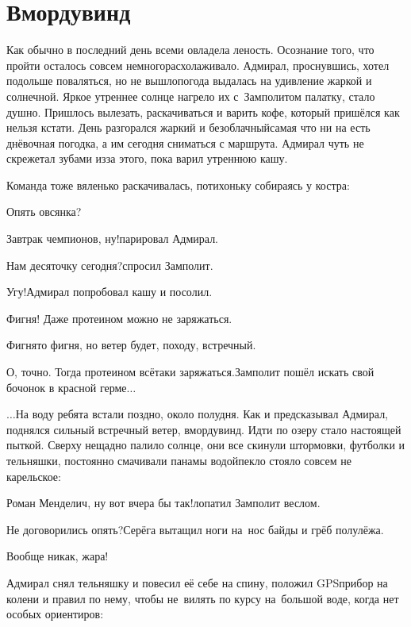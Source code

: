 \chapter{Вмордувинд}
\vepsianrose

Как обычно в последний день всеми овладела леность. Осознание того, что пройти осталось совсем немного\mdash расхолаживало. Адмирал, проснувшись, хотел подольше поваляться, но не вышло\mdash погода выдалась на удивление жаркой и солнечной. Яркое утреннее солнце нагрело их с~Замполитом палатку, стало душно. Пришлось вылезать, раскачиваться и варить кофе, который пришёлся как нельзя кстати. День разгорался жаркий и безоблачный\mdash самая что ни на есть днёвочная погодка, а им сегодня сниматься с маршрута. Адмирал чуть не скрежетал зубами из\sdash за этого, пока варил утреннюю кашу. 

Команда тоже вяленько раскачивалась, потихоньку собираясь у костра:

\diagdash Опять овсянка?

\diagdash Завтрак чемпионов, ну!\mdash парировал Адмирал.

\diagdash Нам десяточку сегодня?\mdash спросил Замполит.

\diagdash Угу!\mdash Адмирал попробовал кашу и посолил.

\diagdash Фигня! Даже протеином можно не заряжаться.

\diagdash Фигня\sdash то фигня, но ветер будет, походу, встречный. 

\diagdash О, точно. Тогда протеином всё\sdash таки заряжаться.\mdash Замполит пошёл искать свой бочонок в красной герме$\ldots$

\vspace{0.75em}

$\ldots$На воду ребята встали поздно, около полудня. Как и предсказывал Адмирал, поднялся сильный встречный ветер, вмордувинд. Идти по озеру стало настоящей пыткой. Сверху нещадно палило солнце, они все скинули штормовки, футболки и тельняшки, постоянно смачивали панамы водой\mdash пекло стояло совсем не карельское:

\diagdash Роман Менделич, ну вот вчера бы так!\mdash лопатил Замполит веслом.  

\diagdash Не договорились опять?\mdash Серёга вытащил ноги на~нос байды и грёб полулёжа.

\diagdash Вообще никак, жара!

Адмирал снял тельняшку и повесил её себе на спину, положил GPS\sdash прибор на колени и правил по нему, чтобы не~вилять по курсу на~большой воде, когда нет особых ориентиров:

